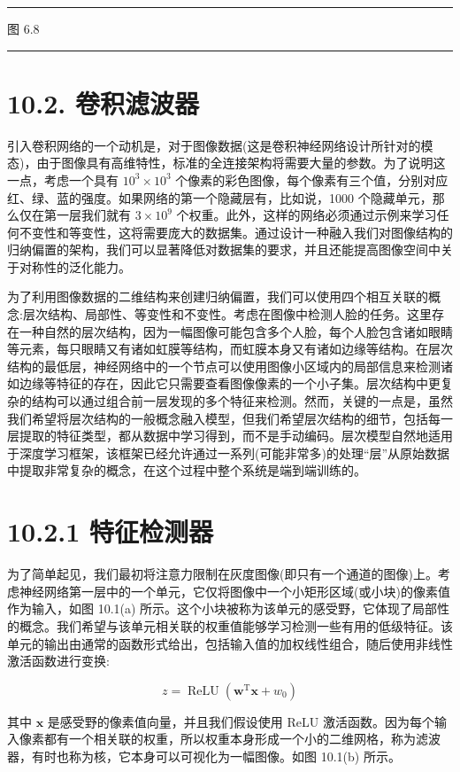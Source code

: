 \documentclass[10pt]{article}
\newcommand{\HRule}{\begin{center}\rule{0.9\linewidth}{0.2mm}\end{center}}
\begin{document}
\HRule

图 6.8

\HRule

\section*{10.2. 卷积滤波器}

引入卷积网络的一个动机是，对于图像数据(这是卷积神经网络设计所针对的模态)，由于图像具有高维特性，标准的全连接架构将需要大量的参数。为了说明这一点，考虑一个具有 \({10}^{3} \times  {10}^{3}\) 个像素的彩色图像，每个像素有三个值，分别对应红、绿、蓝的强度。如果网络的第一个隐藏层有，比如说，1000 个隐藏单元，那么仅在第一层我们就有 \(3 \times  {10}^{9}\) 个权重。此外，这样的网络必须通过示例来学习任何不变性和等变性，这将需要庞大的数据集。通过设计一种融入我们对图像结构的归纳偏置的架构，我们可以显著降低对数据集的要求，并且还能提高图像空间中关于对称性的泛化能力。

为了利用图像数据的二维结构来创建归纳偏置，我们可以使用四个相互关联的概念:层次结构、局部性、等变性和不变性。考虑在图像中检测人脸的任务。这里存在一种自然的层次结构，因为一幅图像可能包含多个人脸，每个人脸包含诸如眼睛等元素，每只眼睛又有诸如虹膜等结构，而虹膜本身又有诸如边缘等结构。在层次结构的最低层，神经网络中的一个节点可以使用图像小区域内的局部信息来检测诸如边缘等特征的存在，因此它只需要查看图像像素的一个小子集。层次结构中更复杂的结构可以通过组合前一层发现的多个特征来检测。然而，关键的一点是，虽然我们希望将层次结构的一般概念融入模型，但我们希望层次结构的细节，包括每一层提取的特征类型，都从数据中学习得到，而不是手动编码。层次模型自然地适用于深度学习框架，该框架已经允许通过一系列(可能非常多)的处理“层”从原始数据中提取非常复杂的概念，在这个过程中整个系统是端到端训练的。

\section*{10.2.1 特征检测器}

为了简单起见，我们最初将注意力限制在灰度图像(即只有一个通道的图像)上。考虑神经网络第一层中的一个单元，它仅将图像中一个小矩形区域(或小块)的像素值作为输入，如图 10.1(a) 所示。这个小块被称为该单元的感受野，它体现了局部性的概念。我们希望与该单元相关联的权重值能够学习检测一些有用的低级特征。该单元的输出由通常的函数形式给出，包括输入值的加权线性组合，随后使用非线性激活函数进行变换:

\[
z = \operatorname{ReLU}\left( {{\mathbf{w}}^{\mathrm{T}}\mathbf{x} + {w}_{0}}\right)  \tag{10.1}
\]

其中 \(\mathbf{x}\) 是感受野的像素值向量，并且我们假设使用 ReLU 激活函数。因为每个输入像素都有一个相关联的权重，所以权重本身形成一个小的二维网格，称为滤波器，有时也称为核，它本身可以可视化为一幅图像。如图 10.1(b) 所示。
\end{document}
